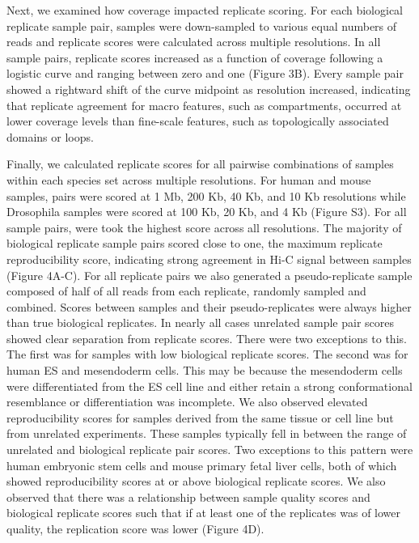 
Next, we examined how coverage impacted replicate scoring. For each biological replicate sample pair, samples were down-sampled to various equal numbers of reads and replicate scores were calculated across multiple resolutions. In all sample pairs, replicate scores increased as a function of coverage following a logistic curve and ranging between zero and one (Figure 3B). Every sample pair showed a rightward shift of the curve midpoint as resolution increased, indicating that replicate agreement for macro features, such as compartments, occurred at lower coverage levels than fine-scale features, such as topologically associated domains or loops.

Finally, we calculated replicate scores for all pairwise combinations of samples within each species set across multiple resolutions. For human and mouse samples, pairs were scored at 1 Mb, 200 Kb, 40 Kb, and 10 Kb resolutions while Drosophila samples were scored at 100 Kb, 20 Kb, and 4 Kb (Figure S3). For all sample pairs, were took the highest score across all resolutions. The majority of biological replicate sample pairs scored close to one, the maximum replicate reproducibility score, indicating strong agreement in Hi-C signal between samples (Figure 4A-C). For all replicate pairs we also generated a pseudo-replicate sample composed of half of all reads from each replicate, randomly sampled and combined. Scores between samples and their pseudo-replicates were always higher than true biological replicates. In nearly all cases unrelated sample pair scores showed clear separation from replicate scores. There were two exceptions to this. The first was for samples with low biological replicate scores. The second was for human ES and mesendoderm cells. This may be because the mesendoderm cells were differentiated from the ES cell line and either retain a strong conformational resemblance or differentiation was incomplete. We also observed elevated reproducibility scores for samples derived from the same tissue or cell line but from unrelated experiments. These samples typically fell in between the range of unrelated and biological replicate pair scores. Two exceptions to this pattern were human embryonic stem cells and mouse primary fetal liver cells, both of which showed reproducibility scores at or above biological replicate scores. We also observed that there was a relationship between sample quality scores and biological replicate scores such that if at least one of the replicates was of lower quality, the replication score was lower (Figure 4D).

